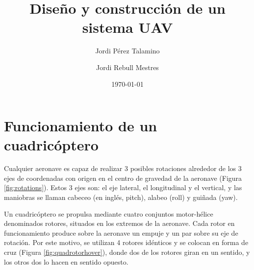 \documentclass[12pt,twoside]{article}
\title{Diseño y construcción de un sistema UAV}
\author{Jordi Pérez Talamino \and Jordi Rebull Mestres}
\date{\today}
\begin{document}
\pagestyle{fancy}

\fancyhead{}

\fancyhead[RE,LO]{\thepage}

\fancyfoot{}
\maketitle

\newpage

\tableofcontents

\newpage

\maketitle

	\section{Funcionamiento de un cuadricóptero}\label{sec:funcionamiento}
	
		Cualquier aeronave es capaz de realizar 3 posibles rotaciones alrededor de los 3 ejes de coordenadas con origen en el centro de gravedad de la aeronave (Figura \ref{fig:rotations}). 
		Estos 3 ejes son: el eje lateral, el longitudinal y el vertical, y las maniobras se llaman cabeceo (en inglés, pitch), alabeo (roll) y guiñada (yaw).
		
		
		Un cuadricóptero se propulsa mediante cuatro conjuntos motor-hélice denominados rotores, situados en los extremos de la aeronave.
		Cada rotor en funcionamiento produce sobre la aeronave un empuje y un par sobre su eje de rotación. 
		Por este motivo, se utilizan 4 rotores idénticos y se colocan en forma de cruz (Figura \ref{fig:quadrotorhover}), 
		donde dos de los rotores giran en un sentido, y los otros dos lo hacen en sentido opuesto.
		
\end{document}
